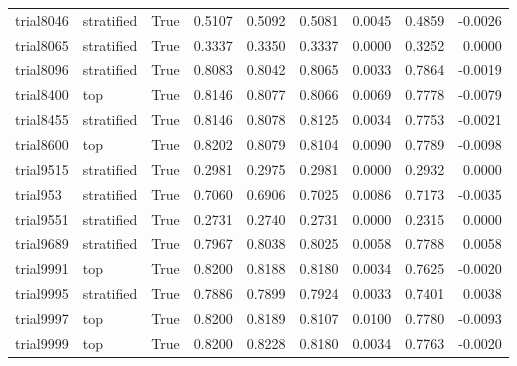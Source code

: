\begin{tabular}{lllrrrrrr}
trial8046 & stratified &         True &  0.5107 &     0.5092 &  0.5081 &     0.0045 &   0.4859 &   -0.0026 \\
trial8065 & stratified &         True &  0.3337 &     0.3350 &  0.3337 &     0.0000 &   0.3252 &    0.0000 \\
trial8096 & stratified &         True &  0.8083 &     0.8042 &  0.8065 &     0.0033 &   0.7864 &   -0.0019 \\
trial8400 &        top &         True &  0.8146 &     0.8077 &  0.8066 &     0.0069 &   0.7778 &   -0.0079 \\
trial8455 & stratified &         True &  0.8146 &     0.8078 &  0.8125 &     0.0034 &   0.7753 &   -0.0021 \\
trial8600 &        top &         True &  0.8202 &     0.8079 &  0.8104 &     0.0090 &   0.7789 &   -0.0098 \\
trial9515 & stratified &         True &  0.2981 &     0.2975 &  0.2981 &     0.0000 &   0.2932 &    0.0000 \\
 trial953 & stratified &         True &  0.7060 &     0.6906 &  0.7025 &     0.0086 &   0.7173 &   -0.0035 \\
trial9551 & stratified &         True &  0.2731 &     0.2740 &  0.2731 &     0.0000 &   0.2315 &    0.0000 \\
trial9689 & stratified &         True &  0.7967 &     0.8038 &  0.8025 &     0.0058 &   0.7788 &    0.0058 \\
trial9991 &        top &         True &  0.8200 &     0.8188 &  0.8180 &     0.0034 &   0.7625 &   -0.0020 \\
trial9995 & stratified &         True &  0.7886 &     0.7899 &  0.7924 &     0.0033 &   0.7401 &    0.0038 \\
trial9997 &        top &         True &  0.8200 &     0.8189 &  0.8107 &     0.0100 &   0.7780 &   -0.0093 \\
trial9999 &        top &         True &  0.8200 &     0.8228 &  0.8180 &     0.0034 &   0.7763 &   -0.0020 \\
\bottomrule
\end{tabular}
